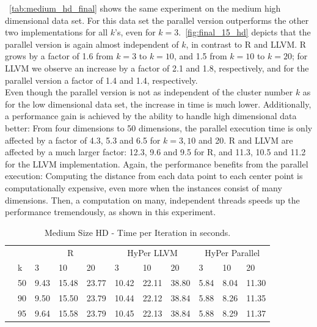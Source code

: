~\autoref{tab:medium_hd_final} shows the same experiment on the medium high dimensional data set. For this data set the parallel version outperforms the other two implementations for all $k$'s, even for $k = 3$.~\autoref{fig:final_15_hd} depicts that the parallel version is again almost independent of $k$, in contrast to R and LLVM. R grows by a factor of 1.6 from $k = 3$ to $k = 10$, and 1.5 from $k = 10$ to $k = 20$; for LLVM we observe an increase by a factor of 2.1 and 1.8, respectively, and for the parallel version a factor of 1.4 and 1.4, respectively. 
\\
Even though the parallel version is not as independent of the cluster number $k$ as for the low dimensional data set, the increase in time is much lower. Additionally, a performance gain is achieved by the ability to handle high dimensional data better: From four dimensions to 50 dimensions, the parallel execution time is only affected by a factor of 4.3, 5.3 and 6.5 for $k = 3, 10$ and 20. R and LLVM are affected by a much larger factor: 12.3, 9.6 and 9.5 for R, and 11.3, 10.5 and 11.2 for the LLVM implementation. Again, the performance benefits from the parallel execution: Computing the distance from each data point to each center point is computationally expensive, even more when the instances consist of many dimensions. Then, a computation on many, independent threads speeds up the performance tremendously, as shown in this experiment. 


\begin{table}[htsb]
  \caption[Medium Size HD - Time per Iteration (Parallel)]{Medium Size HD - Time per Iteration in seconds.}
  \label{tab:medium_hd_final}
  \centering
  \begin{tabular}{l l l ll |l l l |l l l }
    \toprule
      && \multicolumn{3}{c}{R} & \multicolumn{3}{c}{HyPer LLVM} & \multicolumn{3}{c}{HyPer Parallel}  \\
      &k & 3 & 10 & 20 & 3 & 10 & 20 & 3 & 10 & 20 \\
    \midrule
      \parbox[t]{2mm}{} &50  & 9.43 & 15.48 & 23.77 & 10.42 & 22.11 & 38.80 & 5.84 & 8.04 & 11.30 \\
      &90  & 9.50 & 15.50 & 23.79 & 10.44 & 22.12 & 38.84 & 5.88 & 8.26 & 11.35 \\
      &95  & 9.64 & 15.58 & 23.79 & 10.45 & 22.13 & 38.84 & 5.88 & 8.29 & 11.37 \\
    \bottomrule
  \end{tabular}
\end{table}



